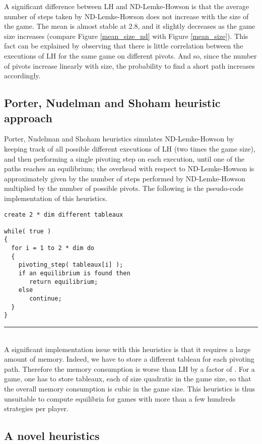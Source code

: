 \documentclass[11pt]{article}
\begin{document}
A significant difference between LH and ND-Lemke-Howson is that the
average number of steps taken by ND-Lemke-Howson does not increase
with the size of the game. The mean is almost stable at 2.8, and it
slightly decreases as the game size increases (compare Figure
\ref{mean_size_nd} with Figure \ref{mean_size}). This fact can be
explained by observing that there is little correlation between the
executions of LH for the same game on different pivots. And so,
since the number of pivots increase linearly with size, the
probability to find a short path increases accordingly.

\subsection{Porter, Nudelman and Shoham heuristic approach}

Porter, Nudelman and Shoham heuristics \cite{simple} simulates
ND-Lemke-Howson by keeping track of all possible different
executions of LH (two times the game size), and then performing a
single pivoting step on each execution, until one of the paths
reaches an equilibrium; the overhead with respect to ND-Lemke-Howson
is approximately given by the number of steps performed by
ND-Lemke-Howson multiplied by the number of possible pivots. The
following is the pseudo-code implementation of this heuristics.

\noindent
\makebox[\textwidth]{\hrulefill}
\begin{verbatim}
create 2 * dim different tableaux

while( true )
{
  for i = 1 to 2 * dim do
  {
    pivoting_step( tableaux[i] );
    if an equilibrium is found then
       return equilibrium;
    else
       continue;
  }
}
\end{verbatim}
\hrule
\hfill\\

A significant implementation issue with this heuristics is that it
requires a large amount of memory. Indeed, we have to store a
different tableau for each pivoting path. Therefore the memory
consumption is worse than LH by a factor of . For a
 game, one has to store  tableaux, each
of size quadratic in the game size, so that the overall memory
consumption is cubic in the game size. This heuristics is thus
unsuitable to compute equilibria for games with more
than a few hundreds strategies per player.

\subsection{A novel heuristics}
\end{document}
